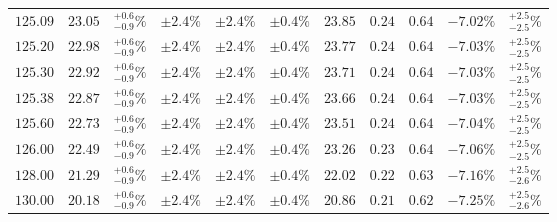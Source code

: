 \begin{table}[ht!]
{{\begin{tabular}{| cc | c | ccc | cccc | c |}
$125.09$ & $23.05$ & $^{+0.6}_{-0.9}\%$ & $\pm 2.4\%$ & {\color{black!55}$\pm 2.4\%$} & {\color{black!55}$\pm 0.4\%$} & $23.85$ & $0.24$ & $0.64$ & $-7.02\%$ & $^{+2.5}_{-2.5}\%$ \\
$125.20$ & $22.98$ & $^{+0.6}_{-0.9}\%$ & $\pm 2.4\%$ & {\color{black!55}$\pm 2.4\%$} & {\color{black!55}$\pm 0.4\%$} & $23.77$ & $0.24$ & $0.64$ & $-7.03\%$ & $^{+2.5}_{-2.5}\%$ \\
$125.30$ & $22.92$ & $^{+0.6}_{-0.9}\%$ & $\pm 2.4\%$ & {\color{black!55}$\pm 2.4\%$} & {\color{black!55}$\pm 0.4\%$} & $23.71$ & $0.24$ & $0.64$ & $-7.03\%$ & $^{+2.5}_{-2.5}\%$ \\
$125.38$ & $22.87$ & $^{+0.6}_{-0.9}\%$ & $\pm 2.4\%$ & {\color{black!55}$\pm 2.4\%$} & {\color{black!55}$\pm 0.4\%$} & $23.66$ & $0.24$ & $0.64$ & $-7.03\%$ & $^{+2.5}_{-2.5}\%$ \\
$125.60$ & $22.73$ & $^{+0.6}_{-0.9}\%$ & $\pm 2.4\%$ & {\color{black!55}$\pm 2.4\%$} & {\color{black!55}$\pm 0.4\%$} & $23.51$ & $0.24$ & $0.64$ & $-7.04\%$ & $^{+2.5}_{-2.5}\%$ \\
$126.00$ & $22.49$ & $^{+0.6}_{-0.9}\%$ & $\pm 2.4\%$ & {\color{black!55}$\pm 2.4\%$} & {\color{black!55}$\pm 0.4\%$} & $23.26$ & $0.23$ & $0.64$ & $-7.06\%$ & $^{+2.5}_{-2.5}\%$ \\
$128.00$ & $21.29$ & $^{+0.6}_{-0.9}\%$ & $\pm 2.4\%$ & {\color{black!55}$\pm 2.4\%$} & {\color{black!55}$\pm 0.4\%$} & $22.02$ & $0.22$ & $0.63$ & $-7.16\%$ & $^{+2.5}_{-2.6}\%$ \\
$130.00$ & $20.18$ & $^{+0.6}_{-0.9}\%$ & $\pm 2.4\%$ & {\color{black!55}$\pm 2.4\%$} & {\color{black!55}$\pm 0.4\%$} & $20.86$ & $0.21$ & $0.62$ & $-7.25\%$ & $^{+2.5}_{-2.6}\%$ \\
\cline{1-11}
\end{tabular}
}
}
\end{table}

